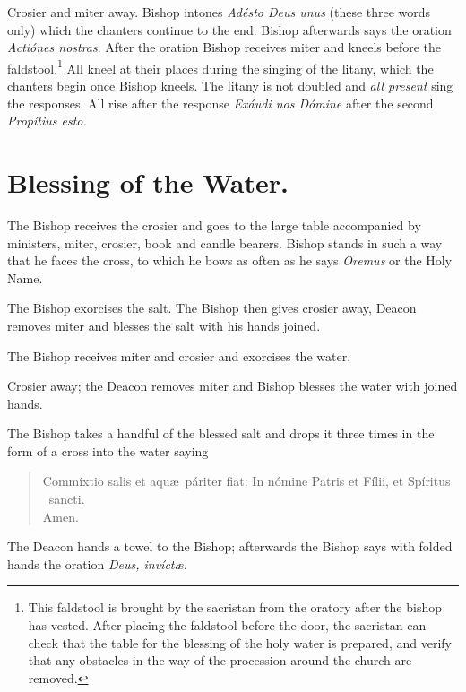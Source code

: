 \documentclass[letterpaper]{report}
\begin{document}
{    \rubric Crosier and miter away. Bishop intones \textit{Ad\'esto Deus unus}
    (these three words only) which the chanters continue to the end. Bishop
    afterwards says the oration \textit{Acti\'ones nostras}. After the oration
    Bishop receives miter and kneels before the faldstool.\footnote{This
    faldstool is brought by the sacristan from the oratory after the bishop has
    vested. After placing the faldstool before the door, the sacristan can
    check that the table for the blessing of the holy water is prepared, and
    verify that any obstacles in the way of the procession around the church
    are removed.} All kneel at their places during the singing of the litany,
    which the chanters begin once Bishop kneels. The litany is not doubled and
    \textit{all present} sing the responses. All rise after the response
    \textit{Ex\'audi nos D\'omine} after the second \textit{Prop\'itius esto.}

    \section{Blessing of the Water.}

    \rubric The Bishop receives the crosier and goes to the large table
    accompanied by ministers, miter, crosier, book and candle bearers. Bishop
    stands in such a way that he faces the cross, to which he bows as often as
    he says \textit{Oremus} or the Holy Name.

    \rubric The Bishop exorcises the salt. The Bishop then gives crosier away,
    Deacon removes miter and blesses the salt with his hands joined.

    \rubric The Bishop receives miter and crosier and exorcises the water.

    \rubric Crosier away; the Deacon removes miter and Bishop blesses the water
    with joined hands.

    \rubric The Bishop takes a handful of the blessed salt and drops it three
    times in the form of a cross into the water saying 

    \begin{quote}
        Commíxtio salis et aqu\ae\ páriter fiat: In nómine Pa\cross tris et
        Fí\cross lii, et Spíritus \cross\ sancti.\\ \rbar Amen.
    \end{quote}

    \rubric The Deacon hands a towel to the Bishop; afterwards the Bishop says
    with folded hands the oration \textit{Deus, invíct\ae.}

}
\end{document}
